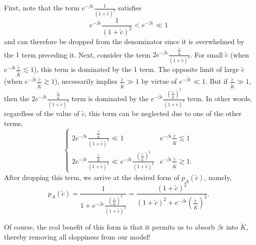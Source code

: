 First, note that the term \(e^{-\beta \epsilon }\frac{1}{\left(1+\tilde{c}\right)^2}\) satisfies
\begin{equation}
e^{-\beta \epsilon }\frac{1}{\left(1+\tilde{c}\right)^2}<e^{-\beta \epsilon }\ll 1
\end{equation}
and can therefore be dropped from the denominator since it is overwhelmed by the
\(1\) term preceding it. Next, consider the term \(2e^{-\beta \epsilon
}\frac{\frac{\tilde{c}}{\tilde{K}}}{\left(1+\tilde{c}\right)^2}\). For small
\(\tilde{c}\) (when $e^{-\beta \epsilon }\frac{\tilde{c}}{\tilde{K}}\lesssim 1$),
this term is dominated by the 1 term. The opposite limit of large $\tilde{c}$
(when \(e^{-\beta \epsilon }\frac{\tilde{c}}{\tilde{K}}\gtrsim 1\)), necessarily
implies \(\frac{\tilde{c}}{\tilde{K}}\gg 1\) by virtue of \(e^{-\beta \epsilon }\ll
1\). But if
\(\frac{\tilde{c}}{\tilde{K}}\gg 1\), then the \(2e^{-\beta \epsilon
}\frac{\frac{\tilde{c}}{\tilde{K}}}{\left(1+\tilde{c}\right)^2}\) term is
dominated by the \(e^{-\beta \epsilon
}\frac{\left(\frac{\tilde{c}}{\tilde{K}}\right)^2}{\left(1+\tilde{c}\right)^2}\)
term. In other words, regardless of the value of \(\tilde{c}\), this term can be
neglected due to one of the other terms,
\begin{equation}
\begin{cases} 
2e^{-\beta \epsilon }\frac{\frac{\tilde{c}}{\tilde{K}}}{\left(1+\tilde{c}\right)^2}\ll 1 & e^{-\beta \epsilon }\frac{\tilde{c}}{\tilde{K}}\lesssim 1 \\
2e^{-\beta \epsilon }\frac{\frac{\tilde{c}}{\tilde{K}}}{\left(1+\tilde{c}\right)^2}\ll e^{-\beta \epsilon }\frac{\left(\frac{\tilde{c}}{\tilde{K}}\right)^2}{\left(1+\tilde{c}\right)^2} & e^{-\beta \epsilon }\frac{\tilde{c}}{\tilde{K}}\gtrsim 1.
\end{cases}
\end{equation}
After dropping this term, we arrive at the desired form of \(p_A\left(\tilde{c}\right)\), namely,
\begin{equation}
p_A\left(\tilde{c}\right)=\frac{1}{1+e^{-\beta \epsilon }\frac{\left(\frac{\tilde{c}}{\tilde{K}}\right)^2}{\left(1+\tilde{c}\right)^2}}=\frac{\left(1+\tilde{c}\right)^2}{\left(1+\tilde{c}\right)^2+e^{-\beta
		\epsilon }\left(\frac{\tilde{c}}{\tilde{K}}\right)^2}.
\end{equation}

Of course, the real benefit of this form is that it permits us to absorb \(\beta \epsilon\) into \(\tilde{K}\), thereby removing all sloppiness from
our model!

\pagebreak